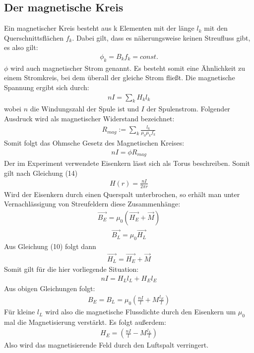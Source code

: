 \documentclass[a4paper,10pt]{scrartcl}
\begin{document}
	\subsection{Der magnetische Kreis}
	
		Ein magnetischer Kreis besteht aus k Elementen mit der länge \(l_{k}\) mit den Querschnittsflächen \(f_{k}\). Dabei gilt, dass es näherungsweise keinen Streufluss gibt, es also gilt:
		\begin{align}
		\phi_{k}=B_{k}f_{k}=const.
		\end{align}
		\(\phi\) wird auch magnetischer Strom genannt.
		Es besteht somit eine Ähnlichkeit zu einem Stromkreis, bei dem überall der gleiche Strom fließt. Die magnetische Spannung ergibt sich durch:
		\begin{align}
		nI=\sum_{k}^{}H_{k}l_{k}
		\end{align}
		wobei \(n\) die Windungszahl der Spule ist und \(I\) der Spulenstrom. Folgender Ausdruck wird als magnetischer Widerstand bezeichnet:
		\begin{align}
		R_{mag}:=\sum_{k}^{}\frac{l_{k}}{\mu_{0}\mu_{k}f_{k}}
		\end{align}
		Somit folgt das Ohmsche Gesetz des Magnetischen Kreises:
		\begin{align}
		nI=\phi R_{mag}
		\end{align}
		Der im Experiment verwendete Eisenkern lässt sich  als Torus beschreiben. Somit gilt nach Gleichung (14)
		\begin{align}
		H(r)=\frac{nI}{2\pi r}
		\end{align}
		Wird der Eisenkern durch einen Querspalt unterbrochen, so erhält man unter Vernachlässigung von Streufeldern diese Zusammenhänge:
		\begin{align}
		\vec{B_{E}}=\mu_{0}(\vec{H_{E}}+\vec{M})
		\end{align}
		\begin{align}
		\vec{B_{L}}=\mu_{0}\vec{H_{L}}
		\end{align}
		Aus Gleichung (10) folgt dann
		\begin{align}
		\vec{H_{L}}=\vec{H_{E}}+\vec{M}
		\end{align}
		Somit gilt für die hier vorliegende Situation:
		\begin{align}
		nI=H_{L}l_{L}+H_{E}l_{E}
		\end{align}
		Aus obigen Gleichungen folgt:
		\begin{align}
		B_{E}=B_{L}=\mu_{0}(\frac{nI}{l}+M\frac{l_{E}}{l})
		\end{align}
		Für kleine \(l_{L}\) wird also die magnetische Flussdichte durch den Eisenkern um \(\mu_{0}\) mal die Magnetisierung verstärkt. Es folgt außerdem:
		\begin{align}
		H_{E}=(\frac{nI}{l}-M\frac{l_{L}}{l})
		\end{align}
		Also wird das magnetisierende Feld durch den Luftspalt verringert.
		
\end{document}
